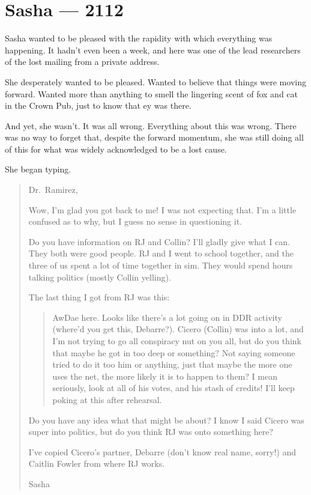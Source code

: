 \hypertarget{sasha-2112}{%
\chapter*{Sasha — 2112}\label{sasha-2112}}

Sasha wanted to be pleased with the rapidity with which everything was happening. It hadn't even been a week, and here was one of the lead researchers of the lost mailing from a private address.

She desperately wanted to be pleased. Wanted to believe that things were moving forward. Wanted more than anything to smell the lingering scent of fox and cat in the Crown Pub, just to know that ey was there.

And yet, she wasn't. It was all wrong. Everything about this was wrong. There was no way to forget that, despite the forward momentum, she was still doing all of this for what was widely acknowledged to be a lost cause.

She began typing.

\begin{quote}
Dr.~Ramirez,

Wow, I'm glad you got back to me! I was not expecting that. I'm a little confused as to why, but I guess no sense in questioning it.

Do you have information on RJ and Collin? I'll gladly give what I can. They both were good people. RJ and I went to school together, and the three of us spent a lot of time together in sim. They would spend hours talking politics (mostly Collin yelling).

The last thing I got from RJ was this:

\begin{quote}
AwDae here. Looks like there's a lot going on in DDR activity (where'd you get this, Debarre?). Cicero (Collin) was into a lot, and I'm not trying to go all conspiracy nut on you all, but do you think that maybe he got in too deep or something? Not saying someone tried to do it too him or anything, just that maybe the more one uses the net, the more likely it is to happen to them? I mean seriously, look at all of his votes, and his stash of credits! I'll keep poking at this after rehearsal.
\end{quote}

Do you have any idea what that might be about? I know I said Cicero was super into politics, but do you think RJ was onto something here?

I've copied Cicero's partner, Debarre (don't know real name, sorry!) and Caitlin Fowler from where RJ works.

Sasha
\end{quote}

